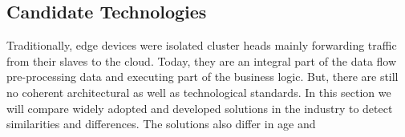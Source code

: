 \subsection{Candidate Technologies}

Traditionally, edge devices were isolated cluster heads mainly forwarding traffic from their slaves to the cloud. Today, they are an integral part of the data flow pre-processing data and executing part of the business logic. But, there are still no coherent architectural as well as technological standards. In this section we will compare widely adopted and developed solutions in the industry to detect similarities and differences. The solutions also differ in age and 


